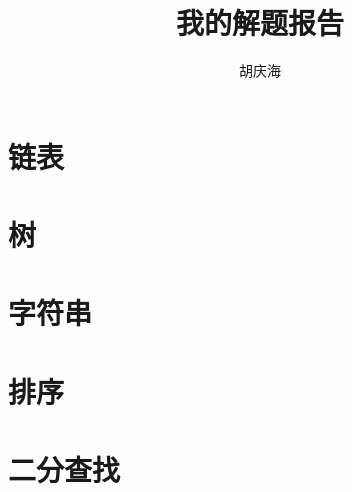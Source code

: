 \documentclass[oneside]{book}
\begin{document}
\begin{CJK}{UTF8}{gbsn}     %

\renewcommand{\contentsname}{目录}
\renewcommand{\figurename}{图}
\renewcommand{\tablename}{表}

\renewcommand{\cftchapfont}{\bfseries}
\renewcommand{\cftchappagefont}{\bfseries}
\renewcommand{\cftchappresnum}{第}
\renewcommand{\cftchapaftersnum}{章:}
\renewcommand{\cftchapnumwidth}{4em}      %

\pagestyle{fancy}
\renewcommand{\chaptermark}[1]{\markboth{\small 第\,\thechapter\,章\quad #1}{}}
\renewcommand{\sectionmark}[1]{\markright{\small\thesection\quad #1}{}}
\fancyhf{}
\fancyhead[ER]{\leftmark}
\fancyhead[OL]{\rightmark}
\fancyhead[EL,OR]{$\cdot$\ \thepage\ $\cdot$}
\renewcommand{\headrulewidth}{0.4pt}

\title{我的解题报告}
\author{胡庆海}
\date{}

\maketitle

\tableofcontents

\chapter{链表}


\chapter{树}


\chapter{字符串}


\chapter{排序}


\chapter{二分查找}



\end{CJK}
\end{document}
